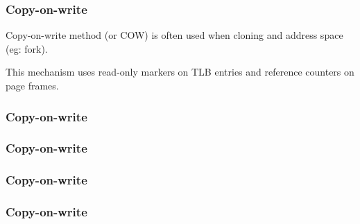 
\begin{frame}
  \frametitle{Copy-on-write}

  Copy-on-write method (or COW) is often used when cloning and address
  space (eg: fork).

  \-

  This mechanism uses read-only markers on TLB entries and reference
  counters on page frames.

\end{frame}


\begin{frame}
  \frametitle{Copy-on-write}

  \begin{center}
  \end{center}

\end{frame}


\begin{frame}
  \frametitle{Copy-on-write}

  \begin{center}
  \end{center}

\end{frame}


\begin{frame}
  \frametitle{Copy-on-write}

  \begin{center}
  \end{center}

\end{frame}


\begin{frame}
  \frametitle{Copy-on-write}

  \begin{center}
  \end{center}

\end{frame}


